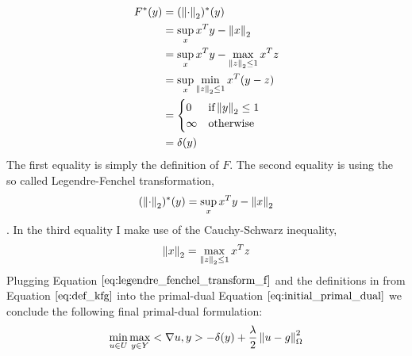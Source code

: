 \begin{align}
	F^*(y) &= (\left\lVert\cdot\right\rVert_2)^*(y) \nonumber \\
		  &= \sup_x x^T y - \left\lVert x\right\rVert_2 \nonumber \\
		  &= \sup_x x^T y - \max_{\left\lVert z\right\rVert_2 \leq 1} x^T z \nonumber \\
		  &= \sup_x \min_{\left\lVert z\right\rVert_2 \leq 1} x^T(y-z) \nonumber \\
		  &= \begin{cases}
   				0  			& \text{if} \left\lVert y\right\rVert_2 \leq 1 \\
   				\infty      & \text{otherwise}
  			 \end{cases} \nonumber \\
  		  &= \delta(y)
\label{eq:legendre_fenchel_transform_f}  		  
\end{align}
The first equality is simply the definition of $F$. The second equality is using the so called Legendre-Fenchel transformation,
\begin{equation}
	(\left\lVert\cdot\right\rVert_2)^*(y) = \sup_x x^T y - \left\lVert x\right\rVert_2 \nonumber
\end{equation}. 
In the third equality I make use of the Cauchy-Schwarz inequality, 
\begin{equation}
	\left\lVert x\right\rVert_2 = \max_{\left\lVert z\right\rVert_2 \leq 1} x^T z
\end{equation}
Plugging Equation $\ref{eq:legendre_fenchel_transform_f}$ and the definitions in from Equation $\ref{eq:def_kfg}$ into the primal-dual Equation $\ref{eq:initial_primal_dual}$ we conclude the following final primal-dual formulation:
\begin{equation}
\min_{u \in U} \max_{y \in Y} <\nabla u, y> - \delta(y) + \frac{\lambda}{2}\left\lVert u - g\right\rVert^2_{\Omega}
\label{eq:final_primal_dual}
\end{equation}

